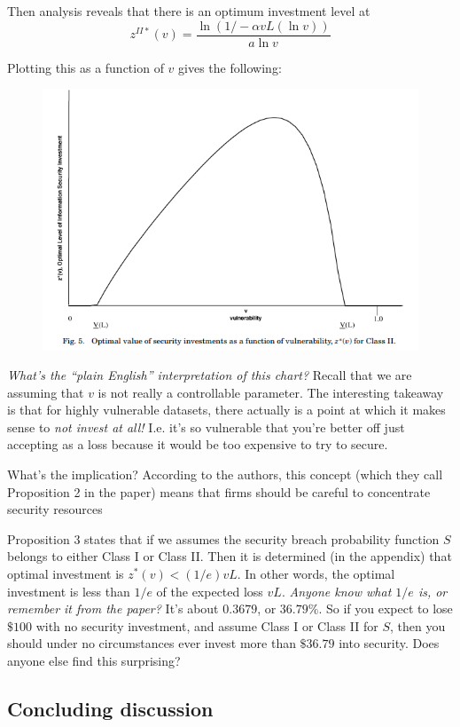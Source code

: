 \documentclass[11pt]{article}
\begin{document}
Then analysis reveals that there is an optimum investment level at 
$$z^{II*}(v) = \frac{\ln (1 / -\alpha v L ( \ln v))}{a \ln v}$$ 

Plotting this as a function of $v$ gives the following:
\begin{figure}[h]
    \centering
    \includegraphics*[width=4.5in]{fig5.png}
    \label{fig:fig5}
\end{figure}
\FloatBarrier

{\it What's the ``plain English'' interpretation of this chart?} Recall that we are assuming that $v$ is not really a controllable parameter. The interesting takeaway is that for highly vulnerable datasets, there actually is a point at which it makes sense to {\it not invest at all!} I.e. it's so vulnerable that you're better off just accepting as a loss because it would be too expensive to try to secure. 

What's the implication? According to the authors, this concept (which they call Proposition 2 in the paper) means that firms should be careful to concentrate security resources

Proposition 3 states that if we assumes the security breach probability function $S$ belongs to either Class I or Class II. Then it is determined (in the appendix) that optimal investment is $z^*(v) < (1/e) v L$. In other words, the optimal investment is less than $1/e$ of the expected loss $vL$. {\it Anyone know what $1/e$ is, or remember it from the paper?} It's about $0.3679$, or $36.79\%$. So if you expect to lose $\$100$ with no security investment, and assume Class I or Class II for $S$, then you should under no circumstances ever invest more than $\$36.79$ into security. Does anyone else find this surprising?

\subsection{Concluding discussion}
\end{document}

